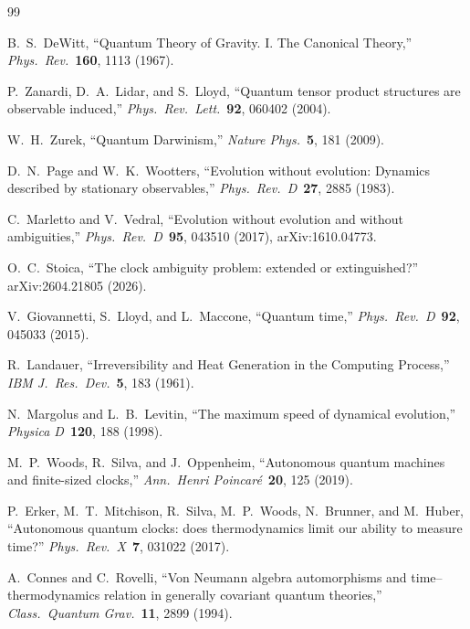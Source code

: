 \documentclass[11pt, a4paper]{article}
\begin{document}
\begin{thebibliography}{99}

B.~S.~DeWitt, ``Quantum Theory of Gravity. I. The Canonical Theory,'' \textit{Phys.\ Rev.}\ \textbf{160}, 1113 (1967).

P.~Zanardi, D.~A.~Lidar, and S.~Lloyd, ``Quantum tensor product structures are observable induced,'' \textit{Phys.\ Rev.\ Lett.}\ \textbf{92}, 060402 (2004).

W.~H.~Zurek, ``Quantum Darwinism,'' \textit{Nature Phys.}\ \textbf{5}, 181 (2009).

D.~N.~Page and W.~K.~Wootters, ``Evolution without evolution: Dynamics described by stationary observables,'' \textit{Phys.\ Rev.\ D}\ \textbf{27}, 2885 (1983).

C.~Marletto and V.~Vedral, ``Evolution without evolution and without ambiguities,'' \textit{Phys.\ Rev.\ D}\ \textbf{95}, 043510 (2017), arXiv:1610.04773.

O.~C.~Stoica, ``The clock ambiguity problem: extended or extinguished?'' arXiv:2604.21805 (2026).

V.~Giovannetti, S.~Lloyd, and L.~Maccone, ``Quantum time,'' \textit{Phys.\ Rev.\ D}\ \textbf{92}, 045033 (2015).

R.~Landauer, ``Irreversibility and Heat Generation in the Computing Process,'' \textit{IBM J.\ Res.\ Dev.}\ \textbf{5}, 183 (1961).

N.~Margolus and L.~B.~Levitin, ``The maximum speed of dynamical evolution,'' \textit{Physica D}\ \textbf{120}, 188 (1998).

M.~P.~Woods, R.~Silva, and J.~Oppenheim, ``Autonomous quantum machines and finite-sized clocks,'' \textit{Ann.\ Henri Poincar\'{e}}\ \textbf{20}, 125 (2019).

P.~Erker, M.~T.~Mitchison, R.~Silva, M.~P.~Woods, N.~Brunner, and M.~Huber, ``Autonomous quantum clocks: does thermodynamics limit our ability to measure time?'' \textit{Phys.\ Rev.\ X}\ \textbf{7}, 031022 (2017).

A.~Connes and C.~Rovelli, ``Von Neumann algebra automorphisms and time--thermodynamics relation in generally covariant quantum theories,'' \textit{Class.\ Quantum Grav.}\ \textbf{11}, 2899 (1994).


\end{thebibliography}
\end{document}
